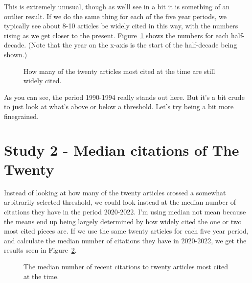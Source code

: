 \documentclass[
  10pt,
  letterpaper,
  DIV=11,
  numbers=noendperiod,
  twoside]{scrartcl}
\begin{document}
\begin{longtable}[]
\end{longtable}

This is extremely unusual, though as we'll see in a bit it is something
of an outlier result. If we do the same thing for each of the five year
periods, we typically see about 8-10 articles be widely cited in this
way, with the numbers rising as we get closer to the present.
Figure~\ref{fig-still-standing} shows the numbers for each half-decade.
(Note that the year on the x-axis is the start of the half-decade being
shown.)

\begin{figure}


\caption{\label{fig-still-standing}How many of the twenty articles most
cited at the time are still widely cited.}

\end{figure}%

As you can see, the period 1990-1994 really stands out here. But it's a
bit crude to just look at what's above or below a threshold. Let's try
being a bit more finegrained.

\section{Study 2 - Median citations of The Twenty}\label{sec-study-two}

Instead of looking at how many of the twenty articles crossed a somewhat
arbitrarily selected threshold, we could look instead at the median
number of citations they have in the period 2020-2022. I'm using median
not mean because the means end up being largely determined by how widely
cited the one or two most cited pieces are. If we use the same twenty
articles for each five year period, and calculate the median number of
citations they have in 2020-2022, we get the results seen in
Figure~\ref{fig-median-cites}.

\begin{figure}


\caption{\label{fig-median-cites}The median number of recent citations
to twenty articles most cited at the time.}

\end{figure}%
\end{document}
